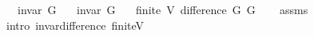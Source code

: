 \begin{isabellebody}
\ \ \ {\isachardoublequoteopen}invar\ G{}{\isachardoublequoteclose}\isanewline
\ \ \ {\isachardoublequoteopen}invar\ G{}{\isachardoublequoteclose}\isanewline
\ \ \ {\isachardoublequoteopen}finite\ {\isacharparenleft}{\kern0pt}V\ {\isacharparenleft}{\kern0pt}difference\ G{}\ G{}{\isacharparenright}{\kern0pt}{\isacharparenright}{\kern0pt}{\isachardoublequoteclose}\isanewline
%
\isadelimproof
\ \ %
\endisadelimproof
%
\isatagproof
{}\isamarkupfalse%
\ assms\isanewline
\ \ \isamarkupfalse%
\ {\isacharparenleft}{\kern0pt}intro\ invar{\isacharunderscore}{\kern0pt}difference\ finite{\isacharunderscore}{\kern0pt}V{\isacharparenright}{\kern0pt}%
\endisatagproof
{\isafoldproof}%
%
\isadelimproof
\isanewline
%
\endisadelimproof
%
\isadelimtheory
\isanewline
%
\endisadelimtheory
%
\isatagtheory
{}\isamarkupfalse%
%
\endisatagtheory
{\isafoldtheory}%
%
\isadelimtheory
%
\endisadelimtheory
%
\end{isabellebody}%
\endinput
